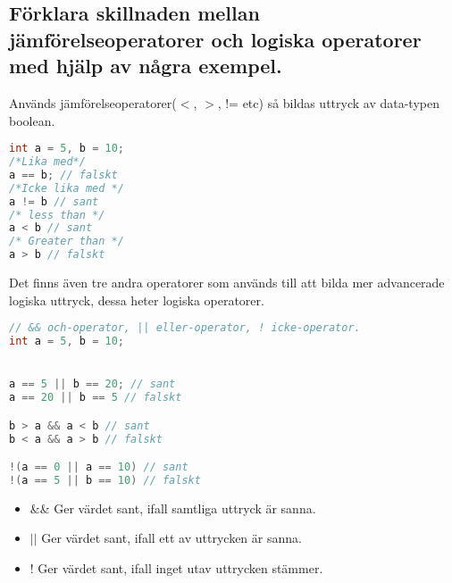 \documentclass[../main.tex]{subfiles}
\begin{document}
\subsection{Förklara skillnaden mellan jämförelseoperatorer och logiska operatorer med hjälp av några exempel.}

Används jämförelseoperatorer($<$, $>$, != etc) så bildas uttryck av data-typen boolean.

\begin{lstlisting}[language=java]
int a = 5, b = 10;
/*Lika med*/
a == b; // falskt
/*Icke lika med */
a != b // sant
/* less than */
a < b // sant
/* Greater than */ 
a > b // falskt

\end{lstlisting}
Det finns även tre andra operatorer som används till att bilda mer advancerade logiska uttryck, dessa heter logiska operatorer.
\begin{lstlisting}[language=java]
// && och-operator, || eller-operator, ! icke-operator.
int a = 5, b = 10;


a == 5 || b == 20; // sant 
a == 20 || b == 5 // falskt

b > a && a < b // sant
b < a && a > b // falskt

!(a == 0 || a == 10) // sant
!(a == 5 || b == 10) // falskt
\end{lstlisting}

\begin{itemize}
    \item \&\& Ger värdet sant, ifall samtliga uttryck är sanna.
    \item $||$ Ger värdet sant, ifall ett av uttrycken är sanna.
    \item $!$ Ger värdet sant, ifall inget utav uttrycken stämmer.
\end{itemize}
\end{document}
